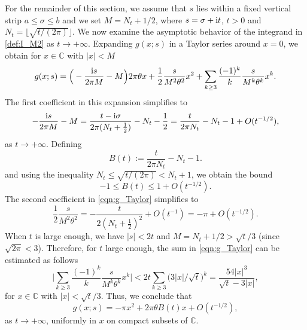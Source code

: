 \documentclass[12pt]{article}
\def\c{{\mathbb C}}
\def\i{{\textnormal i}}
\theoremstyle{definition}
\begin{document}
For the remainder of this section, we assume that $s$ lies within a fixed vertical strip $a\le \sigma \le b$ and we set $M=N_t+1/2$, where $s=\sigma+\i t$, $t>0$ and $N_t=\lfloor \sqrt{t/(2\pi)} \rfloor$. We now examine the asymptotic behavior of the integrand in \eqref{def:I_M2} as $t\to +\infty$. 
Expanding $g(x;s)$ in a Taylor series around $x=0$, we obtain 
for $x\in \c$ with $|x|<M$
\begin{equation}\label{eqn:g_Taylor}
g(x;s)=\Big(-\frac{\i s}{2\pi M}-M\Big) 2\pi \theta x+  
\frac{1}{2} \frac{s}{M^2 \theta^2 } x^2 + \sum\limits_{k\ge 3} 
\frac{(-1)^k}{k} \frac{s }{M^k \theta^k} x^k.
\end{equation}
The first coefficient in this expansion simplifies to
$$
-\frac{\i s}{2\pi M}-M=\frac{t-\i \sigma}{2 \pi (N_t + \frac{1}{2})} - N_t  - \frac{1}{2}=\frac{t}{2\pi N_t}-N_t-1+O(t^{-1/2}),  
$$
as $t\to +\infty$. 
Defining 
\begin{equation*}
B(t):=\frac{t}{2\pi N_t}-N_t-1. 
\end{equation*}
and using the inequality $N_t \le \sqrt{t/(2\pi)} < N_t+1$, we obtain the bound
\begin{equation}\label{bounds_Bt}
-1\le B(t)\le 1+O(t^{-1/2}).
\end{equation}
The second coefficient in \eqref{eqn:g_Taylor} simplifies to
$$
\frac{1}{2} \frac{ s}{M^2 \theta^2 } = - \frac{t}{2 (N_t+\frac{1}{2})^2}+O(t^{-1})=-\pi+O(t^{-1/2}). 
$$
When $t$ is large enough, we have $|s|<2t$ and $M=N_t+1/2 > \sqrt{t}/3$ (since $\sqrt{2\pi}<3$). Therefore, for $t$ large enough, 
the sum in \eqref{eqn:g_Taylor} can be estimated as follows
\begin{equation}
\Big| \sum\limits_{k\ge 3} 
\frac{(-1)^k}{k} \frac{s }{M^k \theta^k} x^k \Big| < 
2t  \sum\limits_{k \ge 3} \Big(3 |x|/\sqrt{t} \Big)^{k}
=  \frac{ 54 |x|^3 }{\sqrt{t}- 3|x| },
\end{equation}
for $x\in \c$ with $|x|<\sqrt{t}/3$. 
Thus, we conclude that  
\begin{equation}\label{eqn:g_asymptotics}
g(x;s)=- \pi x^2+2\pi \theta B(t) x  + O(t^{-1/2}),
\end{equation}
as $t \to +\infty$, uniformly in $x$ on compact subsets of $\c$. 
\end{document}
